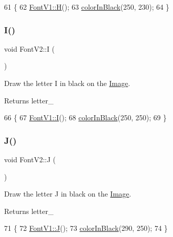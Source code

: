 \begin{DoxyCode}
61                \{
62     \mbox{\hyperlink{class_font_v1_aac6c3d7f8116c21fd9339d07aa63a797}{FontV1::H}}();
63     \mbox{\hyperlink{class_font_v2_a04f2501961bc286ce70fbb6a840b0e8a}{colorInBlack}}(250, 230);
64 \}
\end{DoxyCode}
\mbox{\label{class_font_v2_aaace3b75c86f0536789a232f5b38321d}} 
\subsubsection{\texorpdfstring{I()}{I()}}
{\footnotesize\ttfamily void Font\+V2\+::I (\begin{DoxyParamCaption}{ }\end{DoxyParamCaption})}



Draw the letter I in black on the \mbox{\hyperlink{class_image}{Image}}. 

\begin{DoxyReturn}{Returns}
letter\+\_\+ 
\end{DoxyReturn}

\begin{DoxyCode}
66                \{
67     \mbox{\hyperlink{class_font_v1_aab86d5ae867a26e0384c919f82f0bcf1}{FontV1::I}}();
68     \mbox{\hyperlink{class_font_v2_a04f2501961bc286ce70fbb6a840b0e8a}{colorInBlack}}(250, 250);
69 \}
\end{DoxyCode}
\mbox{\label{class_font_v2_a6cc91c88325f086dc95cd733ebda7849}} 
\subsubsection{\texorpdfstring{J()}{J()}}
{\footnotesize\ttfamily void Font\+V2\+::J (\begin{DoxyParamCaption}{ }\end{DoxyParamCaption})}



Draw the letter J in black on the \mbox{\hyperlink{class_image}{Image}}. 

\begin{DoxyReturn}{Returns}
letter\+\_\+ 
\end{DoxyReturn}

\begin{DoxyCode}
71                \{
72     \mbox{\hyperlink{class_font_v1_a3fe315f13fd21c6dbd5f81113cd1c3f6}{FontV1::J}}();
73     \mbox{\hyperlink{class_font_v2_a04f2501961bc286ce70fbb6a840b0e8a}{colorInBlack}}(290, 250);
74 \}
\end{DoxyCode}
\mbox{\label{class_font_v2_a1871c49a753378d2f50ad91ea8b26c10}} 
